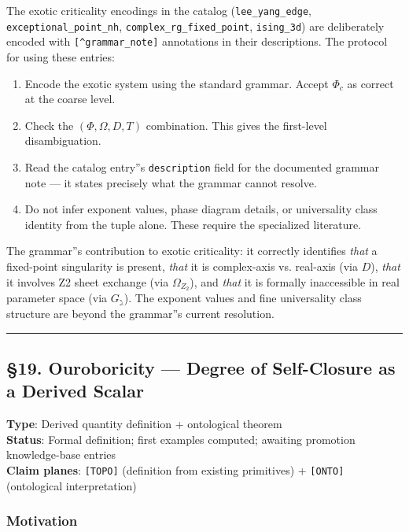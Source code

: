 \documentclass[12pt,a4paper]{article}
\newcommand{\pilcrow}{\S}
\begin{document}
The exotic criticality encodings in the catalog (\texttt{lee\_yang\_edge}, \texttt{exceptional\_point\_nh}, \texttt{complex\_rg\_fixed\_point}, \texttt{ising\_3d}) are deliberately encoded with \texttt{{[}\^{}grammar\_note{]}} annotations in their descriptions. The protocol for using these entries:

\begin{enumerate}
    \item Encode the exotic system using the standard grammar. Accept $\Phi_c$ as correct at the coarse level.
    \item Check the $(\Phi, \Omega, D, T)$ combination. This gives the first-level disambiguation.
    \item Read the catalog entry''s \texttt{description} field for the documented grammar note --- it states precisely what the grammar cannot resolve.
    \item Do not infer exponent values, phase diagram details, or universality class identity from the tuple alone. These require the specialized literature.
\end{enumerate}

The grammar''s contribution to exotic criticality: it correctly identifies \emph{that} a fixed-point singularity is present, \emph{that} it is complex-axis vs. real-axis (via $D$), \emph{that} it involves Z2 sheet exchange (via $\Omega_{Z_2}$), and \emph{that} it is formally inaccessible in real parameter space (via $G_{\gimel}$). The exponent values and fine universality class structure are beyond the grammar''s current resolution.

\begin{center}
\rule{0.5\textwidth}{0.4pt}
\end{center}

\subsection{\pilcrow{}19. Ouroboricity --- Degree of Self-Closure as a Derived Scalar}

\textbf{Type}: Derived quantity definition + ontological theorem   \\
\textbf{Status}: Formal definition; first examples computed; awaiting promotion knowledge-base entries   \\
\textbf{Claim planes}: \texttt{{[}TOPO{]}} (definition from existing primitives) + \texttt{{[}ONTO{]}} (ontological interpretation)

\subsubsection{Motivation}
\end{document}
